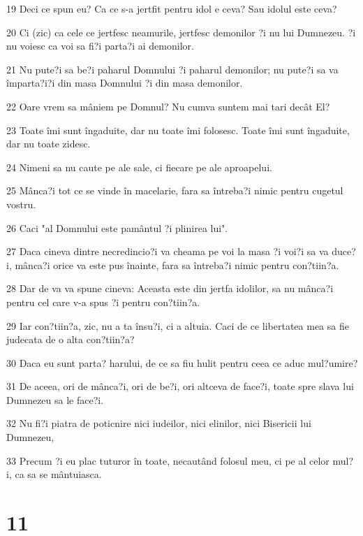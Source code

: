 \par 19 Deci ce spun eu? Ca ce s-a jertfit pentru idol e ceva? Sau idolul este ceva?
\par 20 Ci (zic) ca cele ce jertfesc neamurile, jertfesc demonilor ?i nu lui Dumnezeu. ?i nu voiesc ca voi sa fi?i parta?i ai demonilor.
\par 21 Nu pute?i sa be?i paharul Domnului ?i paharul demonilor; nu pute?i sa va împarta?i?i din masa Domnului ?i din masa demonilor.
\par 22 Oare vrem sa mâniem pe Domnul? Nu cumva suntem mai tari decât El?
\par 23 Toate îmi sunt îngaduite, dar nu toate îmi folosesc. Toate îmi sunt îngaduite, dar nu toate zidesc.
\par 24 Nimeni sa nu caute pe ale sale, ci fiecare pe ale aproapelui.
\par 25 Mânca?i tot ce se vinde în macelarie, fara sa întreba?i nimic pentru cugetul vostru.
\par 26 Caci "al Domnului este pamântul ?i plinirea lui".
\par 27 Daca cineva dintre necredincio?i va cheama pe voi la masa ?i voi?i sa va duce?i, mânca?i orice va este pus înainte, fara sa întreba?i nimic pentru con?tiin?a.
\par 28 Dar de va va spune cineva: Aceasta este din jertfa idolilor, sa nu mânca?i pentru cel care v-a spus ?i pentru con?tiin?a.
\par 29 Iar con?tiin?a, zic, nu a ta însu?i, ci a altuia. Caci de ce libertatea mea sa fie judecata de o alta con?tiin?a?
\par 30 Daca eu sunt parta? harului, de ce sa fiu hulit pentru ceea ce aduc mul?umire?
\par 31 De aceea, ori de mânca?i, ori de be?i, ori altceva de face?i, toate spre slava lui Dumnezeu sa le face?i.
\par 32 Nu fi?i piatra de poticnire nici iudeilor, nici elinilor, nici Bisericii lui Dumnezeu,
\par 33 Precum ?i eu plac tuturor în toate, necautând folosul meu, ci pe al celor mul?i, ca sa se mântuiasca.

\chapter{11}

